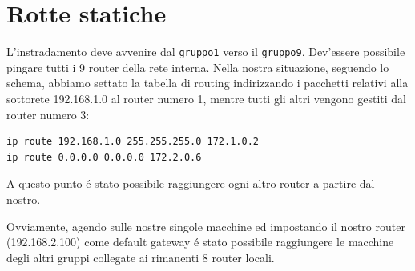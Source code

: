 \documentclass[9pt, a4paper, oneside]{article}
\begin{document}
		\section{Rotte statiche}
			\par
			 L'instradamento deve avvenire dal \texttt{gruppo1} verso il \texttt{gruppo9}. Dev'essere possibile pingare tutti i 9 router della rete interna. 
			 Nella nostra situazione, seguendo lo schema, abbiamo settato la tabella di routing indirizzando i pacchetti relativi alla sottorete 192.168.1.0 al router numero 1, mentre tutti gli altri vengono gestiti dal router numero 3: 
				\begin{verbatim}
ip route 192.168.1.0 255.255.255.0 172.1.0.2 
ip route 0.0.0.0 0.0.0.0 172.2.0.6 
				\end{verbatim}
				A questo punto \'e stato possibile raggiungere 
				ogni altro router a partire dal nostro.
				\par
				Ovviamente, agendo sulle nostre singole macchine ed impostando il nostro router (192.168.2.100) come default gateway \'e stato possibile raggiungere le macchine degli altri gruppi collegate ai rimanenti 8 router locali.
\end{document}
